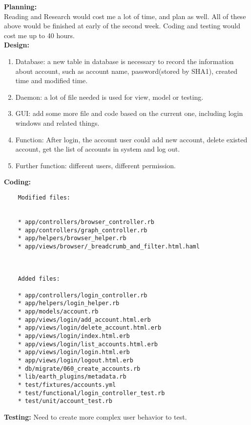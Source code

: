 \documentclass[10pt,a4,oneside]{article}
\begin{document}
\textbf{Planning:}\\
Reading and Research would cost me a lot of time, and plan as well. All of these above would be finished at early of the second week. Coding and testing would cost me up to 40 hours.\\

\textbf{Design:}\\
\begin{enumerate}
 \item Database: a new table in database is necessary to record the information about account, such as account name, password(stored by SHA1), created time and modified time. \\
\item Daemon: a lot of file needed is used for view, model or testing. \\
\item GUI: add some more file and code based on the current one, including login windows and related things.\\
\item Function: After login, the account user could add new account, delete existed account, get the list of accounts in system and log out.\\
\item Further function: different users, different permission. 
\end{enumerate}

\textbf{Coding:}\\
\begin{verbatim}
    Modified files: 


    * app/controllers/browser_controller.rb
    * app/controllers/graph_controller.rb
    * app/helpers/browser_helper.rb
    * app/views/browser/_breadcrumb_and_filter.html.haml



    Added files: 

    * app/controllers/login_controller.rb
    * app/helpers/login_helper.rb
    * app/models/account.rb
    * app/views/login/add_account.html.erb
    * app/views/login/delete_account.html.erb
    * app/views/login/index.html.erb
    * app/views/login/list_accounts.html.erb
    * app/views/login/login.html.erb
    * app/views/login/logout.html.erb
    * db/migrate/060_create_accounts.rb
    * lib/earth_plugins/metadata.rb
    * test/fixtures/accounts.yml
    * test/functional/login_controller_test.rb
    * test/unit/account_test.rb
\end{verbatim}
\textbf{Testing:}
Need to create more complex user behavior to test.\\
\end{document}
